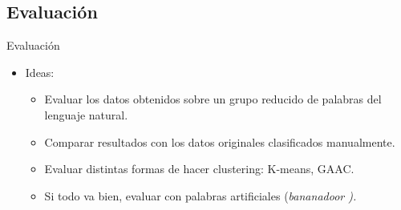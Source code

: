 \documentclass[xcolor=x11names,compress]{beamer}
\renewcommand{\(}{\begin{columns}}
\renewcommand{\)}{\end{columns}}
\newcommand{\<}[1]{\begin{column}{#1}}
\renewcommand{\>}{\end{column}}
\begin{document}
\subsection{Evaluación}
\begin{frame}{Evaluación}
\begin{itemize}
\item Ideas:
\begin{itemize}
\item Evaluar los datos obtenidos sobre un grupo reducido de palabras del lenguaje natural.
\item Comparar resultados con los datos originales clasificados manualmente.
\item Evaluar distintas formas de hacer clustering: K-means, GAAC.
\item Si todo va bien, evaluar con palabras artificiales (\em bananadoor \em).
\end{itemize}
\end{itemize}
\end{frame}
\end{document}
